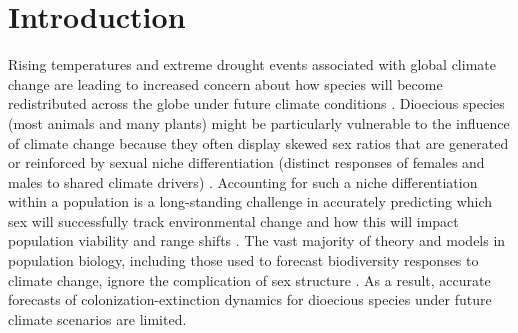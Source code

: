 \documentclass[12pt]{article}
\newcommand{\tom}[2]{{\color{red}{#1}}\footnote{\textit{\color{red}{#2}}}}
\begin{document}
\newpage
\section*{Introduction}
Rising temperatures and extreme drought events associated with global climate change are leading to increased concern about how species will become redistributed across the globe under future climate conditions \citep{bertrand2011changes,gamelon2017interactions,smith2024extreme}.
Dioecious species (most animals and many plants) might be particularly vulnerable to the influence of climate change because they often display skewed sex ratios that are generated or reinforced by sexual niche differentiation (distinct responses of females and males to shared climate drivers) \citep{Tognetti2012}. 
Accounting for such a niche differentiation within a population is a long-standing challenge in accurately predicting which sex will successfully track environmental change and how this will impact population viability and range shifts \citep{jones1999sex,gissi2023exploring}. 
The vast majority of theory and models in population biology, including those used to forecast biodiversity responses to climate change, ignore the complication of sex structure \citep{pottier2021sexual,ellis2017does}.
As a result, accurate forecasts of colonization-extinction dynamics for dioecious species under future climate scenarios are limited.

\end{document}
